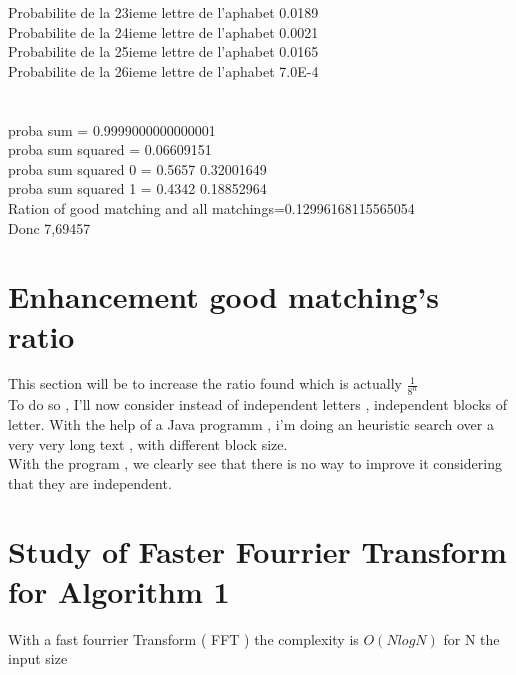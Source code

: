 \documentclass{article}
\begin{document}
Probabilite de la 23ieme lettre de l'aphabet 0.0189\\
Probabilite de la 24ieme lettre de l'aphabet 0.0021\\
Probabilite de la 25ieme lettre de l'aphabet 0.0165\\
Probabilite de la 26ieme lettre de l'aphabet 7.0E-4\\
\\
\\
proba sum = 0.9999000000000001\\
proba sum squared = 0.06609151\\
proba sum squared 0 = 0.5657 0.32001649\\
proba sum squared 1 = 0.4342 0.18852964\\
Ration of good matching and all matchings=0.12996168115565054\\
Donc 7,69457

\section{Enhancement good matching's ratio}

This section will be to increase the ratio found which is actually $\frac{1}{8^n}$\\
To do so , I'll now consider instead of independent letters , independent blocks of letter.
With the help of a Java programm , i'm doing an heuristic search over a very very long text , with different block size.\\
With the program , we clearly see that there is no way to improve it considering that they are independent.\\

\section{Study of Faster Fourrier Transform for Algorithm 1}
With a fast fourrier Transform ( FFT ) the complexity is $O(NlogN)$ for N the input size\\
\end{document}
